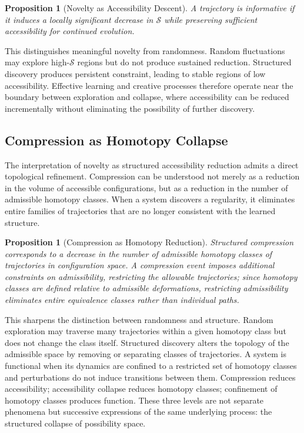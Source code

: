 \documentclass[11pt, a4paper, twocolumn]{article}
\newtheorem{proposition}[definition]{Proposition}
\newcommand{\Sfield}{\mathcal{S}}
\begin{document}
\begin{proposition}[Novelty as Accessibility Descent]
A trajectory is informative if it induces a locally significant decrease in
$\Sfield$ while preserving sufficient accessibility for continued evolution.
\end{proposition}

This distinguishes meaningful novelty from randomness. Random fluctuations may
explore high-$\Sfield$ regions but do not produce sustained reduction. Structured
discovery produces persistent constraint, leading to stable regions of low
accessibility. Effective learning and creative processes therefore operate near
the boundary between exploration and collapse, where accessibility can be
reduced incrementally without eliminating the possibility of further discovery.

\subsection{Compression as Homotopy Collapse}

The interpretation of novelty as structured accessibility reduction admits a
direct topological refinement. Compression can be understood not merely as a
reduction in the volume of accessible configurations, but as a reduction in
the number of admissible homotopy classes. When a system discovers a regularity,
it eliminates entire families of trajectories that are no longer consistent with
the learned structure.

\begin{proposition}[Compression as Homotopy Reduction]
Structured compression corresponds to a decrease in the number of admissible
homotopy classes of trajectories in configuration space. A compression event
imposes additional constraints on admissibility, restricting the allowable
trajectories; since homotopy classes are defined relative to admissible
deformations, restricting admissibility eliminates entire equivalence classes
rather than individual paths.
\end{proposition}

This sharpens the distinction between randomness and structure. Random
exploration may traverse many trajectories within a given homotopy class but
does not change the class itself. Structured discovery alters the topology of
the admissible space by removing or separating classes of trajectories. A
system is functional when its dynamics are confined to a restricted set of
homotopy classes and perturbations do not induce transitions between them.
Compression reduces accessibility; accessibility collapse reduces homotopy
classes; confinement of homotopy classes produces function. These three levels
are not separate phenomena but successive expressions of the same underlying
process: the structured collapse of possibility space.
\end{document}
